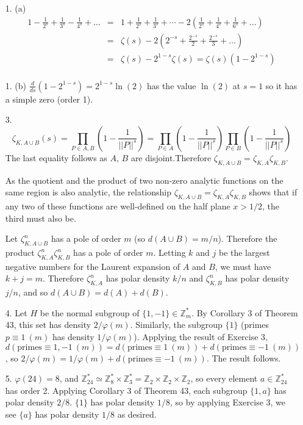 \documentclass{article}
\newcommand{\z}[0]{\zeta}
\newcommand{\Z}[0]{\mathbb{Z}}
\newcommand{\Zmult}[1]{\mathbb{Z}_{#1}^{*}}
\newcommand{\modequiv}[3]{#1 \equiv #2\ (#3)}
\begin{document}
\begin{enumerate}
    \item [1. (a)]
    \begin{eqnarray*}
        1 - \frac{1}{2^s} + \frac{1}{3^s} - \frac{1}{4^s} + \ldots &=& 1 + \frac{1}{2^s} + \frac{1}{3^s} + \cdots - 2 \left( \frac{1}{2^s} + \frac{1}{4^s} + \frac{1}{6^s} + \ldots \right) \\
        &=& \zeta(s) - 2\left(2^{-s} + \frac{2^{-s}}{2} + \frac{2^{-s}}{3} + \ldots \right) \\
        &=& \zeta(s) - 2^{1-s}\zeta(s) = \zeta(s) (1 - 2^{1-s}) \\
    \end{eqnarray*}
    \item [1. (b)]
        $\frac{d}{ds} (1 - 2^{1-s}) = 2^{1-s} \ln (2)$ has the value $\ln(2)$ at $s = 1$ so it has a simple zero (order 1).
    \item [3.]
    \[ \z_{K, A \cup B}(s) = \prod_{P \in A, B} \left(1 - \frac{1}{||P||^{s}}\right) = \prod_{P \in A} \left(1 - \frac{1}{||P||^{s}}\right) \prod_{P \in B} \left(1 - \frac{1}{||P||^{s}}\right) \] The last equality follows as $A$, $B$ are disjoint.Therefore $\z_{K, A \cup B} = \z_{K, A} \z_{K, B}$.

    As the quotient and the product of two non-zero analytic functions on the same region is also analytic, the relationship $\z_{K, A \cup B} = \z_{K, A} \z_{K, B}$ shows that if any two of these functions are well-defined on the half plane $x > 1/2$, the third must also be.

    Let $\z_{K, A \cup B}^{n}$ has a pole of order $m$ (so $d(A \cup B) = m /n$).  Therefore the product $\z_{K, A}^{n} \z_{K, B}^{n}$ has a pole of order $m$.  Letting $k$ and $j$ be the largest negative numbers for the Laurent expansion of $A$ and $B$, we must have $k + j = m$.  Therefore $\z_{K, A}^{n}$ has polar density $k / n$ and $\z_{K, B}^{n}$ has polar density $j / n$, and so $d(A \cup B) = d(A) + d(B)$.

    \item [4.] Let $H$ be the normal subgroup of $\{1, -1\} \in \Z^{*}_m$. By Corollary 3 of Theorem 43, this set has density $2 / \varphi(m)$.  Similarly, the subgroup $\{1\}$ (primes $\modequiv{p}{1}{m}$ has density $1 / \varphi(m)$).  Applying the result of Exercise 3, $d(\modequiv{\text{primes}}{1, -1}{m}) = d(\modequiv{\text{primes}}{1}{m}) + d(\modequiv{\text{primes}}{-1}{m})$, so $2 / \varphi(m) = 1 / \varphi(m) + d(\modequiv{\text{primes}}{-1}{m})$.  The result follows.

    \item [5.] $\varphi(24) = 8$, and $\Zmult{24} \simeq \Zmult{8} \times \Zmult{3} = \Z_{2} \times \Z_{2} \times \Z_{2}$, so every element $a \in \Zmult{24}$ has order 2.  Applying Corollary 3 of Theorem 43, each subgroup $\{1, a\}$ has polar density $2 / 8$.  $\{1\}$ has polar density $1 / 8$, so by applying Exercise 3, we see $\{a\}$ has polar density $1 / 8$ as desired.
\end{enumerate}
\end{document}
